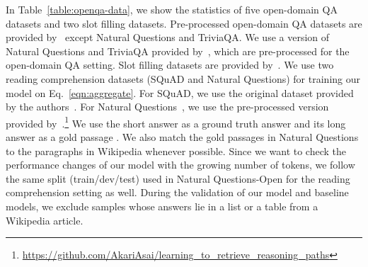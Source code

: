 \documentclass[11pt,a4paper]{article}
\begin{document}
\begin{table}[t]
\label{table:dataset}
\begin{center}
\centering
{}
\end{center}
\caption{Statistics of five open-domain QA datasets and two slot filling datasets. We follow the same splits in open-domain QA for the two reading comprehension datasets (SQuAD and Natural Questions).}\vspace{-0.3cm}\label{table:openqa-data}
\end{table}
 In Table~\ref{table:openqa-data}, we show the statistics of five open-domain QA datasets and two slot filling datasets.
Pre-processed open-domain QA datasets are provided by~\citet{chen2017reading} except Natural Questions and TriviaQA.
We use a version of Natural Questions and TriviaQA provided by~\citet{min2019discrete,lee2019latent}, which are pre-processed for the open-domain QA setting.
Slot filling datasets are provided by~\citet{petroni2020kilt}.
We use two reading comprehension datasets (SQuAD and Natural Questions) for training our model on Eq.~\eqref{eqn:aggregate}.
For SQuAD, we use the original dataset provided by the authors~\citep{rajpurkar2016squad}.
For Natural Questions~\citep{kwiatkowski2019natural}, we use the pre-processed version provided by~\citet{asai2019learning}.\footnote{\url{https://github.com/AkariAsai/learning\_to\_retrieve\_reasoning\_paths}}
We use the short answer as a ground truth answer  and its long answer as a gold passage .
We also match the gold passages in Natural Questions to the paragraphs in Wikipedia whenever possible.
Since we want to check the performance changes of our model with the growing number of tokens, we follow the same split (train/dev/test) used in Natural Questions-Open for the reading comprehension setting as well.
During the validation of our model and baseline models, we exclude samples whose answers lie in a list or a table from a Wikipedia article.
\end{document}
